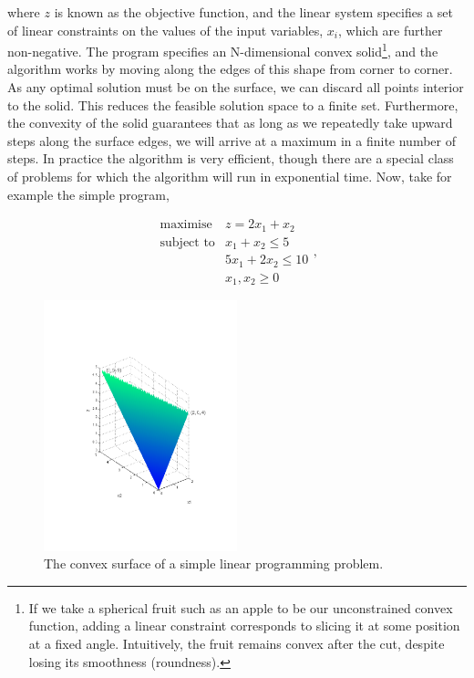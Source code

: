 \documentclass[11pt]{amsart}
\begin{document}
where $z$ is known as the objective function, and the linear system specifies a set of linear constraints on the values of the input variables, $x_i$, which are further non-negative. The program specifies an N-dimensional convex solid\footnote{If we take a spherical fruit such as an apple to be our unconstrained convex function, adding a linear constraint corresponds to slicing it at some position at a fixed angle. Intuitively, the fruit remains convex after the cut, despite losing its smoothness (roundness).}, and the algorithm works by moving along the edges of this shape from corner to corner. As any optimal solution must be on the surface, we can discard all points interior to the solid. This reduces the feasible solution space to a finite set. Furthermore, the convexity of the solid guarantees that as long as we repeatedly take upward steps along the surface edges, we will arrive at a maximum in a finite number of steps. In practice the algorithm is very efficient, though there are a special class of problems for which the algorithm will run in exponential time. Now, take for example the simple program,

$$
\begin{array}{rl}
\text{maximise} & z = 2x_1 + x_2 \\
\text{subject to} & x_1 + x_2 \leq 5 \\
& 5x_1 + 2x_2 \leq 10 \\
& x_1, x_2 \geq 0
\end{array},
$$

\begin{figure}[!ht]
\centering
\includegraphics[width=0.5\textwidth]{Figures/simplex.pdf}
\caption{The convex surface of a simple linear programming problem.}
\label{fig:simplex}
\end{figure}
\end{document}
